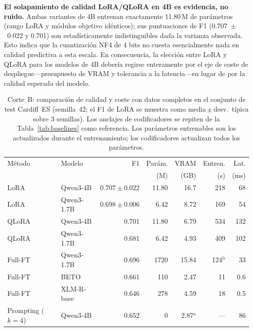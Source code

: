 \documentclass[conference]{IEEEtran}
\begin{document}
\textbf{El solapamiento de calidad LoRA/QLoRA en 4B es evidencia, no ruido.}
Ambas variantes de 4B entrenan exactamente 11.80\,M de parámetros (rango LoRA y
módulos objetivo idénticos); sus puntuaciones de F1 (0.707~$\pm$~0.022 y 0.701)
son estadísticamente indistinguibles dada la varianza observada.
Esto indica que la cuantización NF4 de 4 bits no cuesta esencialmente nada en
calidad predictiva a esta escala.  En consecuencia, la elección entre LoRA
y QLoRA para los modelos de 4B debería regirse enteramente por el eje de coste de
despliegue---presupuesto de VRAM y tolerancia a la latencia---en lugar de por la
calidad esperada del modelo.

\begin{table}[t]
  \centering
  \caption{Corte~B: comparación de calidad y coste con datos completos en el
    conjunto de test Cardiff~ES (semilla~42; el F1 de LoRA se muestra como
    media\,$\pm$\,desv.\ típica sobre 3 semillas).
    Los anclajes de codificadores se repiten de la Tabla~\ref{tab:baselines}
    como referencia.
    Los parámetros entrenables son los actualizados durante el entrenamiento;
    los codificadores actualizan todos los parámetros.}
  \label{tab:cutB}
  \small
  \begin{tabular}{@{}llrrrrr@{}}
    \toprule
    Método & Modelo & F1 & Parám. & VRAM & Entren. & Lat. \\
           &        &    & (M)    & (GB) & (s)     & (ms) \\
    \midrule
    LoRA    & Qwen3-4B   & $0.707\!\pm\!0.022$ & 11.80  & 16.7  & 218 & 68 \\
    LoRA    & Qwen3-1.7B & $0.698\!\pm\!0.006$ & 6.42   &  8.72 & 169 & 54 \\
    QLoRA   & Qwen3-4B   & 0.701               & 11.80  &  6.79 & 534 & 132 \\
    QLoRA   & Qwen3-1.7B & 0.681               & 6.42   &  4.93 & 409 & 102 \\
    Full-FT & Qwen3-1.7B & 0.696               & 1720   & 15.84 & 124$^{\mathrm{b}}$ & 33 \\
    \midrule
    Full-FT & BETO        & 0.661              & 110    &  2.47 & 11  & 0.6 \\
    Full-FT & XLM-R-base  & 0.646              & 278    &  4.59 & 18  & 0.5 \\
    Prompting ($k=4$) & Qwen3-4B & 0.652      & 0      &  2.87$^{\mathrm{a}}$ & --- & 86 \\
    \bottomrule
  \end{tabular}
  \\[2pt]

\end{table}
\end{document}
